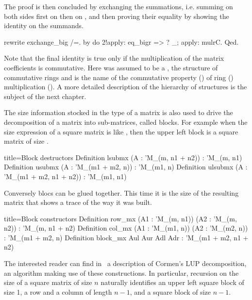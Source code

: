 The proof is then concluded by exchanging the summations, i.e.
summing
on both sides first on  then on , and then proving their
equality by showing the identity on the summands.

\begin{coq}{}{}
rewrite exchange_big /=.
by do 2!apply: eq_bigr => ? _; apply: mulrC.
Qed.
\end{coq}

Note that the final identity is true only if the multiplication
of the matrix coefficients is commutative.  Here 
was assumed to be a , the structure of commutative
rings and  is the name of the commutative property () of
ring () multiplication ().
A more detailed description of the hierarchy of structures is the
subject of the next chapter.


The size information stocked in the type of a matrix is
also used to drive the decomposition of a matrix into sub-matrices,
called blocks.  For example when the size expression of a square
matrix is like , then the upper left block
is a square matrix of size .

\begin{coq}{}{title=Block destructors}
Definition lsubmx (A : 'M_(m, n1 + n2)) : 'M_(m, n1)
Definition usubmx (A : 'M_(m1 + m2, n)) : 'M_(m1, n)
Definition ulsubmx (A : 'M_(m1 + m2, n1 + n2)) : 'M_(m1, n1)
\end{coq}
Conversely blocs can be glued together.  This time it is the
size of the resulting matrix that shows a trace of the way
it was built.

\begin{coq}{}{title=Block constructors}
Definition row_mx (A1 : 'M_(m, n1)) (A2 : 'M_(m, n2)) : 'M_(m, n1 + n2)
Definition col_mx (A1 : 'M_(m1, n)) (A2 : 'M_(m2, n)) : 'M_(m1 + m2, n)
Definition block_mx Aul Aur Adl Adr : 'M_(m1 + m2, n1 + n2)
\end{coq}

The interested reader can find in~\cite{packedclasses}
a description of Cormen's LUP decomposition, an algorithm
making use of these constructions.  In particular, recursion
on the size of a square matrix of size $n$ naturally identifies
an upper left square block of size 1, a row and a column of length $n-1$,
and a square block of size $n-1$.

